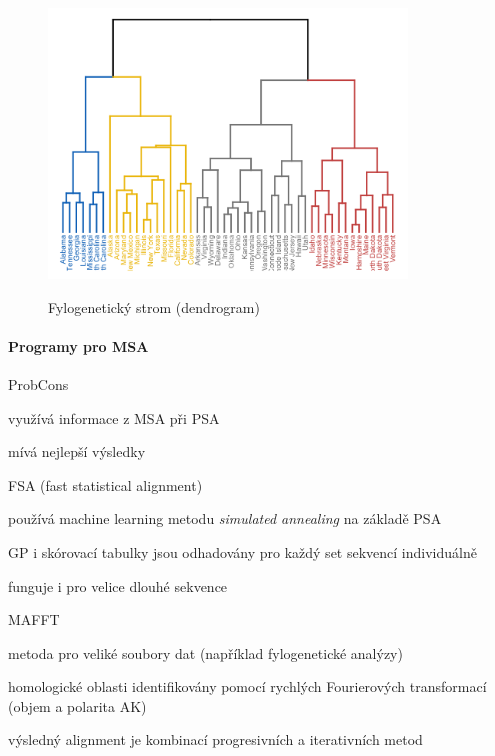 \documentclass[DIV=8]{scrreprt}
\begin{document}
\begin{figure}
    \caption{Fylogenetický strom (dendrogram)}
    \includegraphics[width=0.85\textwidth]{dendrogram.png}
    \centering
    \label{}
\end{figure}


\paragraph{Programy pro MSA}
\begin{myItemize}[nosep]
    \item ProbCons
\begin{myItemize}[nosep]
    \item využívá informace z MSA při PSA
    \item mívá nejlepší výsledky
\end{myItemize}

    \item FSA (fast statistical alignment)
\begin{myItemize}[nosep]
    \item používá machine learning metodu \emph{simulated annealing} na základě PSA
    \item GP i skórovací tabulky jsou odhadovány pro každý set sekvencí individuálně
    \item funguje i pro velice dlouhé sekvence
\end{myItemize}

    \item MAFFT
\begin{myItemize}[nosep]
    \item metoda pro veliké soubory dat (například fylogenetické analýzy)
    \item homologické oblasti identifikovány pomocí rychlých Fourierových transformací (objem a polarita AK)
    \item výsledný alignment je kombinací progresivních a iterativních metod
\end{myItemize}

\end{myItemize}
\end{document}
